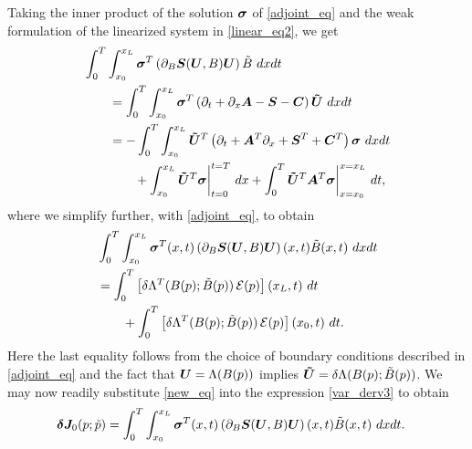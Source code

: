Taking the inner product of the solution $\bm{\sigma}$ of \eqref{adjoint_eq}  and the weak formulation of the linearized system in \eqref{linear_eq2}, we get
\begin{equation} 
\begin{split}
\label{ibp_eq}
 &\int_0^T \int_{x_0}^{x_L} \bm{\sigma}^T \left(\partial_{B}\bm{S}(\bm{U},B)\bm{U}\right){\tilde{B}} \ dxdt \\
    &\qquad =\int_0^T \int_{x_0}^{x_L} \bm{\sigma}^T \left(\partial_t+\partial_x \bm{A} - \bm{S} -\bm{C} \right)\bm{\tilde{U}} \ dxdt  \\
    &\qquad =
    -\int_0^T \int_{x_0}^{x_L} \bm{\tilde{U}}^T \left(\partial_t+ \bm{A}^T\partial_x +\bm{S}^T + \bm{C}^T\right)\bm{\sigma} \ dxdt  \\
    &\qquad\qquad + \int_{x_0}^{x_L} \bm{\tilde{U}}^T \bm{\sigma}\bigg|_{t=0}^{t=T} \ dx
    + \int_0^T \bm{\tilde{U}}^T \bm{A}^T\bm{\sigma}\bigg|_{x=x_0}^{x=x_L} \ dt ,
\end{split}
\end{equation}
where we simplify further, with \eqref{adjoint_eq}, to obtain
\begin{equation} \label{new_eq}
\begin{split}
    & \int_0^T \int_{x_0}^{x_L} \bm{\sigma}^T(x,t) \left(\partial_{B}\bm{S}(\bm{U},B)\bm{U}\right) (x,t) {\tilde{B}}(x,t) \ dxdt \\
    & = \int_0^T \left[\delta{\Lambda}^T(B(p);{\tilde{B}}(p)) \, \mathcal{E}(p)\right](x_L,t) \ dt \\
    & \qquad + \int_0^T\left[\delta{\Lambda}^T(B(p);{\tilde{B}}(p)) \, \mathcal{E}(p)\right](x_0,t)\ dt. \\
\end{split}
\end{equation}
Here the last equality follows from the choice of boundary conditions described in \eqref{adjoint_eq} and the fact that $\bm{U} = \Lambda(B(p)) $ implies $\bm{\tilde{U}} = \delta{\Lambda}( B(p) ;{\tilde{B}}(p) )$. 
We may now readily substitute \eqref{new_eq} into the expression \eqref{var_derv3} to obtain
\begin{equation} \label{var_derv4}
\begin{split}
      \bm{\delta J}_0(p;\tilde{p}) & = \int_0^T \int_{x_0}^{x_L} \bm{\sigma}^T(x,t) \left(\partial_{B}\bm{S}(\bm{U},B)\bm{U}\right) (x,t) {\tilde{B}}(x,t) \ dxdt. 
\end{split}
\end{equation}
